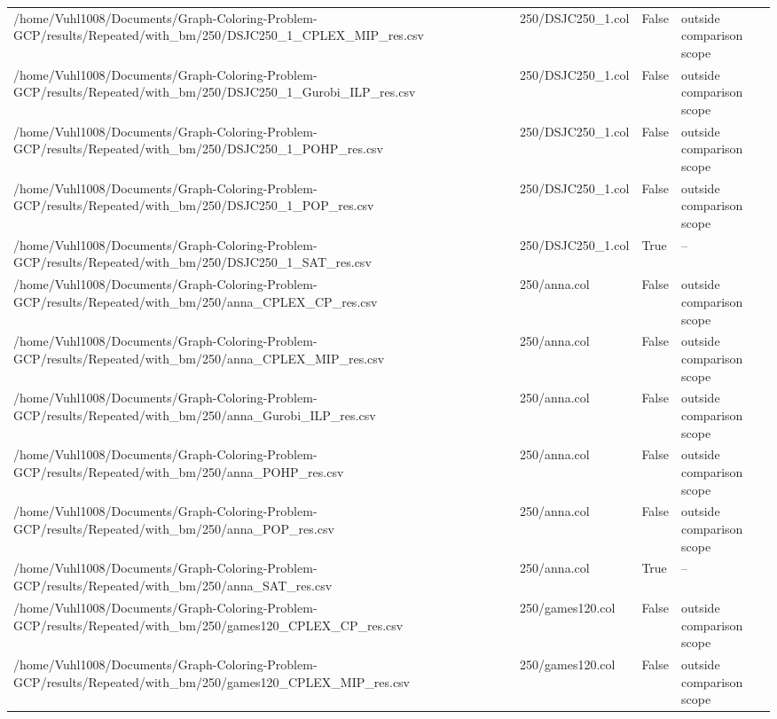 \begin{table}[htbp]
\begin{tabular}{llll}
/home/Vuhl1008/Documents/Graph-Coloring-Problem-GCP/results/Repeated/with\_bm/250/DSJC250\_1\_CPLEX\_MIP\_res.csv & 250/DSJC250\_1.col & False & outside comparison scope \\
/home/Vuhl1008/Documents/Graph-Coloring-Problem-GCP/results/Repeated/with\_bm/250/DSJC250\_1\_Gurobi\_ILP\_res.csv & 250/DSJC250\_1.col & False & outside comparison scope \\
/home/Vuhl1008/Documents/Graph-Coloring-Problem-GCP/results/Repeated/with\_bm/250/DSJC250\_1\_POHP\_res.csv & 250/DSJC250\_1.col & False & outside comparison scope \\
/home/Vuhl1008/Documents/Graph-Coloring-Problem-GCP/results/Repeated/with\_bm/250/DSJC250\_1\_POP\_res.csv & 250/DSJC250\_1.col & False & outside comparison scope \\
/home/Vuhl1008/Documents/Graph-Coloring-Problem-GCP/results/Repeated/with\_bm/250/DSJC250\_1\_SAT\_res.csv & 250/DSJC250\_1.col & True & -- \\
/home/Vuhl1008/Documents/Graph-Coloring-Problem-GCP/results/Repeated/with\_bm/250/anna\_CPLEX\_CP\_res.csv & 250/anna.col & False & outside comparison scope \\
/home/Vuhl1008/Documents/Graph-Coloring-Problem-GCP/results/Repeated/with\_bm/250/anna\_CPLEX\_MIP\_res.csv & 250/anna.col & False & outside comparison scope \\
/home/Vuhl1008/Documents/Graph-Coloring-Problem-GCP/results/Repeated/with\_bm/250/anna\_Gurobi\_ILP\_res.csv & 250/anna.col & False & outside comparison scope \\
/home/Vuhl1008/Documents/Graph-Coloring-Problem-GCP/results/Repeated/with\_bm/250/anna\_POHP\_res.csv & 250/anna.col & False & outside comparison scope \\
/home/Vuhl1008/Documents/Graph-Coloring-Problem-GCP/results/Repeated/with\_bm/250/anna\_POP\_res.csv & 250/anna.col & False & outside comparison scope \\
/home/Vuhl1008/Documents/Graph-Coloring-Problem-GCP/results/Repeated/with\_bm/250/anna\_SAT\_res.csv & 250/anna.col & True & -- \\
/home/Vuhl1008/Documents/Graph-Coloring-Problem-GCP/results/Repeated/with\_bm/250/games120\_CPLEX\_CP\_res.csv & 250/games120.col & False & outside comparison scope \\
/home/Vuhl1008/Documents/Graph-Coloring-Problem-GCP/results/Repeated/with\_bm/250/games120\_CPLEX\_MIP\_res.csv & 250/games120.col & False & outside comparison scope \\

\end{tabular}
\end{table}
